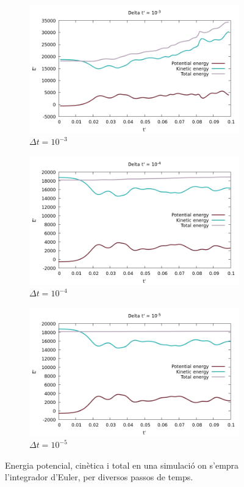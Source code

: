 \documentclass[a4paper,10pt]{article}
\begin{document}
\begin{figure}
	\centering
	\begin{subfigure}{0.45\linewidth}
		\includegraphics[width=\linewidth]{energy_euler_1}
		\caption{$\Delta t = 10^{-3}$}
		\label{fig:energyeuler1}
	\end{subfigure}
	\begin{subfigure}{0.45\linewidth}
		\includegraphics[width=\linewidth]{energy_euler_2}
		\caption{$\Delta t = 10^{-4}$}
		\label{fig:energyeuler2}
	\end{subfigure}
	\begin{subfigure}{0.45\linewidth}
		\includegraphics[width=\linewidth]{energy_euler_3} 
		\caption{$\Delta t = 10^{-5}$}
		\label{fig:energyeuler3}
	\end{subfigure}
	\caption{Energia potencial, cinètica i total en una simulació on s'empra l'integrador d'Euler, per diversos passos de temps.}
	\label{fig:energyeuler}
\end{figure}
\end{document}
